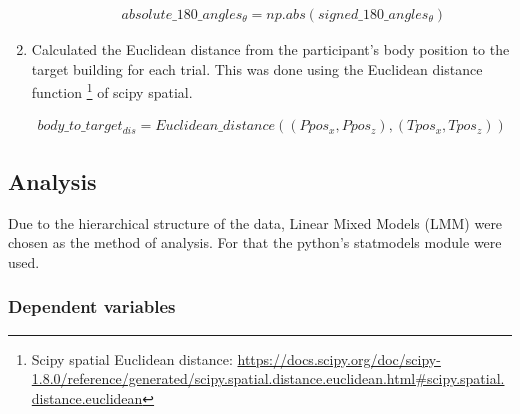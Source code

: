 \begin{enumerate}
\begin{enumerate}
		\begin{align*}
			absolute\_180\_angles_{\theta} = np.abs(signed\_180\_angles_{\theta})
		\end{align*}
		
	\end{enumerate}

	\item Calculated the Euclidean distance from the participant's body position to the target building for each trial. This was done using the Euclidean distance function \footnote{Scipy spatial Euclidean distance: \href{https://docs.scipy.org/doc/scipy-1.8.0/reference/generated/scipy.spatial.distance.euclidean.html\#scipy.spatial.distance.euclidean}{https://docs.scipy.org/doc/scipy-1.8.0/reference/generated/scipy.spatial.distance.euclidean.html\#scipy.spatial.distance.euclidean}} of scipy spatial.
	
	\begin{align*}
		body\_to\_target_{dis} = Euclidean\_distance((Ppos_x, Ppos_z), (Tpos_x, Tpos_z))
	\end{align*}

\end{enumerate}



\subsection{Analysis}
Due to the hierarchical structure of the data, Linear Mixed Models (LMM) were chosen as the method of analysis. For that the python's statmodels module were used.

\subsubsection{Dependent variables}

